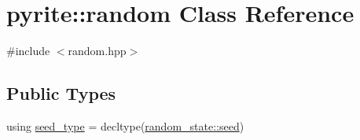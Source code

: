 \hypertarget{classpyrite_1_1random}{}\section{pyrite\+:\+:random Class Reference}
\label{classpyrite_1_1random}


{\ttfamily \#include $<$random.\+hpp$>$}

\subsection*{Public Types}
\begin{DoxyCompactItemize}
\item 
using \mbox{\hyperlink{classpyrite_1_1random_a936dc9fd106c9b125ccbf3aa6d525e4b}{seed\+\_\+type}} = decltype(\mbox{\hyperlink{structpyrite_1_1random__state_a0e2c55b67459b8e81c7d94cde7aab26a}{random\+\_\+state\+::seed}})
\end{DoxyCompactItemize}
